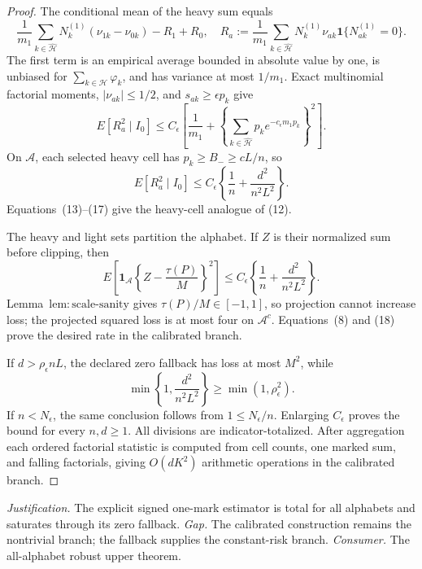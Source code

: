 \documentclass{article}
\begin{document}
\begin{proof}
The conditional mean of the heavy sum equals
\[
 \frac1{m_1}\sum_{k\in\widehat{\mathcal H}}N_k^{(1)}
 (\nu_{1k}-\nu_{0k})-R_1+R_0,
\quad
 R_a:=\frac1{m_1}\sum_{k\in\widehat{\mathcal H}}
 N_k^{(1)}\nu_{ak}\mathbf1\{N_{ak}^{(1)}=0\}.
\tag{15}
\]
The first term is an empirical average bounded in absolute value by one, is unbiased for \(\sum_{k\in\widehat{\mathcal H}}\varphi_k\), and has variance at most \(1/m_1\).  Exact multinomial factorial moments, \(|\nu_{ak}|\le1/2\), and \(s_{ak}\ge\epsilon p_k\) give
\[
 E[R_a^2\mid I_0]\le C_{\epsilon}\left[
 \frac1{m_1}+
 \left\{\sum_{k\in\widehat{\mathcal H}}p_ke^{-c_{\epsilon}m_1p_k}\right\}^2
 \right].
\tag{16}
\]
On \(\mathcal A\), each selected heavy cell has \(p_k\ge B_-\ge cL/n\), so
\[
 E[R_a^2\mid I_0]\le C_{\epsilon}\left\{\frac1n+\frac{d^2}{n^2L^2}\right\}.
\tag{17}
\]
Equations~(13)--(17) give the heavy-cell analogue of (12).

The heavy and light sets partition the alphabet.  If \(Z\) is their normalized sum before clipping, then
\[
 E\!\left[\mathbf1_{\mathcal A}\left\{Z-\frac{\tau(P)}M\right\}^2\right]
 \le C_{\epsilon}\left\{\frac1n+\frac{d^2}{n^2L^2}\right\}.
\tag{18}
\]
Lemma~\(\mathrm{lem:scale\text{-}sanity}\) gives \(\tau(P)/M\in[-1,1]\), so projection cannot increase loss; the projected squared loss is at most four on \(\mathcal A^c\).  Equations~(8) and (18) prove the desired rate in the calibrated branch.

If \(d>\rho_{\epsilon}nL\), the declared zero fallback has loss at most \(M^2\), while
\[
 \min\left\{1,\frac{d^2}{n^2L^2}\right\}\ge\min(1,\rho_{\epsilon}^2).
\tag{19}
\]
If \(n<N_{\epsilon}\), the same conclusion follows from \(1\le N_{\epsilon}/n\).  Enlarging \(C_{\epsilon}\) proves the bound for every \(n,d\ge1\).  All divisions are indicator-totalized.  After aggregation each ordered factorial statistic is computed from cell counts, one marked sum, and falling factorials, giving \(O(dK^2)\) arithmetic operations in the calibrated branch.
\end{proof}
\par\smallskip\noindent \textit{Justification.} The explicit signed one-mark estimator is total for all alphabets and saturates through its zero fallback. \textit{Gap.} The calibrated construction remains the nontrivial branch; the fallback supplies the constant-risk branch. \textit{Consumer.} The all-alphabet robust upper theorem.
\end{document}
